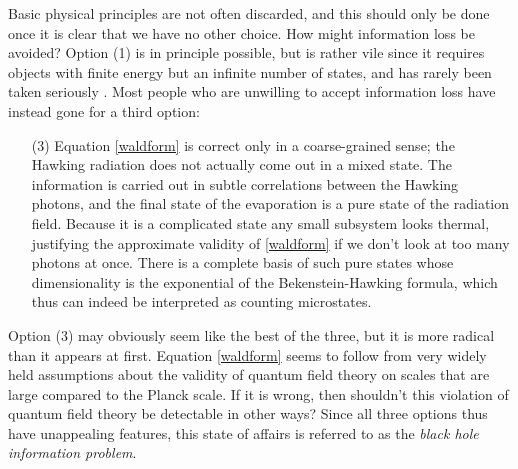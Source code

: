 \documentclass[12pt]{article}
\begin{document}
Basic physical principles are not often discarded, and this should only be done once it is clear that we have no other choice.  How might information loss be avoided?  Option (1) is in principle possible, but is rather vile since it requires objects with finite energy but an infinite number of states, and has rarely been taken seriously \cite{Preskill:1992tc,Giddings:1994qt,Susskind:1995da}.  
  Most people who are unwilling to accept information loss have instead gone for a third option:
\begin{itemize}
\item[(3)] Equation \eqref{waldform} is correct only in a coarse-grained sense; the Hawking radiation does not actually come out in a mixed state.  The information is carried out in subtle correlations between the Hawking photons, and the final state of the evaporation is a pure state of the radiation field.  Because it is a complicated state any small subsystem looks thermal, justifying the approximate validity of \eqref{waldform} if we don't look at too many photons at once.  There is a complete basis of such pure states whose dimensionality is the exponential of the Bekenstein-Hawking formula, which thus can indeed be interpreted as counting microstates.
\end{itemize}
Option (3) may obviously seem like the best of the three, but it is more radical than it appears at first.  Equation \eqref{waldform} seems to follow from very widely held assumptions about the validity of quantum field theory on scales that are large compared to the Planck scale.  If it is wrong, then shouldn't this violation of quantum field theory be detectable in other ways?  Since all three options thus have unappealing features, this state of affairs is referred to as the \textit{black hole information problem}.
\end{document}
